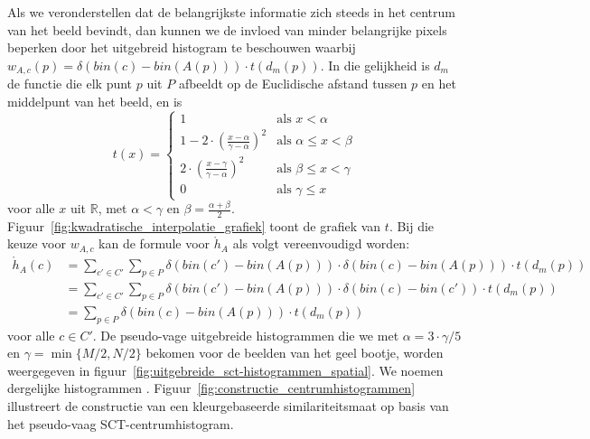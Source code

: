 Als we veronderstellen dat
de belangrijkste informatie zich steeds in het centrum van het beeld bevindt, dan kunnen we
de invloed van minder belangrijke pixels beperken door het uitgebreid histogram te beschouwen waarbij
$w_{A,c}(p)=\delta(bin(c)-bin(A(p))) \cdot t(d_m(p))$. In die gelijkheid is $d_m$ de functie die 
elk punt $p$ uit $P$ afbeeldt op de Euclidische afstand tussen $p$ en het middelpunt van het beeld, 
en is
\begin{displaymath}
t(x) = \begin{cases}
1 & \textrm{als } x < \alpha \\
1 - 2 \cdot \left( \frac{x-\alpha}{\gamma - \alpha} \right)^2 & \textrm{als } \alpha \le x < \beta \\[6pt]
2 \cdot \left( \frac{x-\gamma}{\gamma - \alpha} \right)^2 & \textrm{als } \beta \le x < \gamma \\
0 & \textrm{als } \gamma \le x
\end{cases}
\end{displaymath}
voor alle $x$ uit $\mathbb{R}$, met $\alpha < \gamma$ en $\beta=\frac{\alpha + \beta}{2}$. 
Figuur~\ref{fig:kwadratische_interpolatie_grafiek} toont de grafiek van $t$. Bij
die keuze voor $w_{A,c}$ kan de formule voor $\mathring{h}_A$ als volgt vereenvoudigd worden:
\begin{align*}
\mathring{h}_A(c)
 & = \displaystyle \sum_{c' \in C'} \sum_{p \in P} \delta (bin(c')-bin(A(p))) \cdot \delta (bin(c)-bin(A(p))) \cdot t(d_m(p)) \\
 & = \displaystyle \sum_{c' \in C'} \sum_{p \in P} \delta (bin(c')-bin(A(p))) \cdot \delta (bin(c)-bin(c')) \cdot t(d_m(p)) \\
 & = \displaystyle \sum_{p \in P} \delta (bin(c)-bin(A(p))) \cdot t(d_m(p))
\end{align*}
voor alle $c \in C'$. De pseudo-vage uitgebreide
histogrammen die we met $\alpha=3 \cdot \gamma / 5$ en $\gamma = \min\{M/2, N/2\}$ bekomen voor 
de beelden van het geel bootje, worden weergegeven in
figuur~\ref{fig:uitgebreide_sct-histogrammen_spatial}. We noemen dergelijke histogrammen
. Figuur~\ref{fig:constructie_centrumhistogrammen} illustreert
de constructie van een kleurgebaseerde similariteitsmaat op basis van het pseudo-vaag 
SCT-centrumhistogram.

